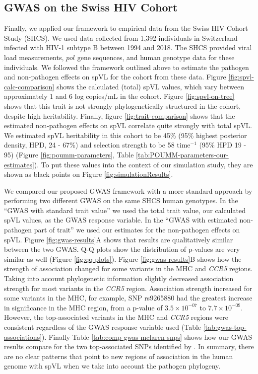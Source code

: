 \documentclass[11pt]{article}
\begin{document}
\begin{linenumbers}
\subsection*{GWAS on the Swiss HIV Cohort}

Finally, we applied our framework to empirical data from the Swiss HIV Cohort Study (SHCS). We used data collected from 1,392 individuals in Switzerland infected with HIV-1 subtype B between 1994 and 2018. The SHCS provided viral load measurements, $pol$ gene sequences, and human genotype data for these individuals. We followed the framework outlined above to estimate the pathogen and non-pathogen effects on spVL for the cohort from these data. Figure \ref{fig:spvl-calc-comparison} shows the calculated (total) spVL values, which vary between approximately 1 and 6 log copies/mL in the cohort.  Figure \ref{fig:spvl-on-tree} shows that this trait is not strongly phylogenetically structured in the cohort, despite high heritability. Finally, figure \ref{fig:trait-comparison} shows that the estimated non-pathogen effects on spVL correlate quite strongly with total spVL. We estimated spVL heritability in this cohort to be 45\% (95\% highest posterior density, HPD, 24 - 67\%) and selection strength to be 58 time$^{-1}$ (95\% HPD 19 - 95) (Figure \ref{fig:poumm-parameters}, Table \ref{tab:POUMM-parameters-our-estimates}). To put these values into the context of our simulation study, they are shown as black points on Figure \ref{fig:simulationResults}.

We compared our proposed GWAS framework with a more standard approach by performing two different GWAS on the same SHCS human genotypes. In the ``GWAS with standard trait value'' we used the total trait value, our calculated spVL values, as the GWAS response variable. In the ``GWAS with estimated non-pathogen part of trait'' we used our estimates for the non-pathogen effects on spVL. Figure \ref{fig:gwas-results}A shows that results are qualitatively similar between the two GWAS. Q-Q plots show the distribution of p-values are very similar as well (Figure \ref{fig:qq-plots}). Figure \ref{fig:gwas-results}B shows how the strength of association changed for some variants in the MHC and \emph{CCR5} regions. Taking into account phylogenetic information slightly decreased association strength for most variants in the \emph{CCR5} region. Association strength increased for some variants in the MHC, for example, SNP rs9265880 had the greatest increase in significance in the MHC region, from a p-value of $3.5 \times 10^{-07}$ to $7.7 \times 10^{-09}$. However, the top-associated variants in the MHC and \emph{CCR5} regions were consistent regardless of the GWAS response variable used (Table \ref{tab:gwas-top-associations}). Finally Table \ref{tab:comp-gwas-mclaren-snps} shows how our GWAS results compare for the two top-associated SNPs identified by \citet{McLaren2015}. In summary, there are no clear patterns that point to new regions of association in the human genome with spVL when we take into account the pathogen phylogeny.


\end{linenumbers}
\end{document}
